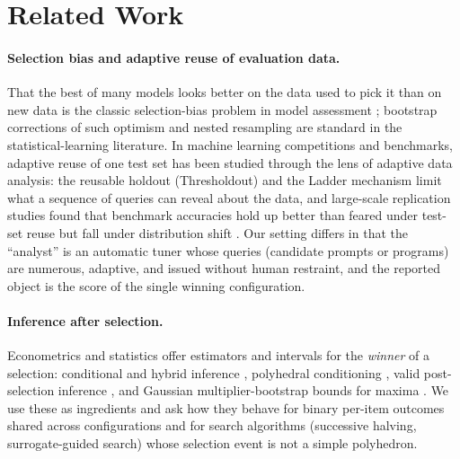 \section{Related Work}
\paragraph{Selection bias and adaptive reuse of evaluation data.}
That the best of many models looks better on the data used to pick it than on new data is the classic selection-bias problem in model assessment \citep{cawley2010overfitting}; bootstrap corrections of such optimism \citep{efron1997632} and nested resampling are standard in the statistical-learning literature.
In machine learning competitions and benchmarks, adaptive reuse of one test set has been studied through the lens of adaptive data analysis: the reusable holdout (Thresholdout) \citep{dwork2015generalization,dwork2015preserving} and the Ladder mechanism \citep{blum2015ladder} limit what a sequence of queries can reveal about the data, and large-scale replication studies found that benchmark accuracies hold up better than feared under test-set reuse but fall under distribution shift \citep{recht2019imagenet}.
Our setting differs in that the ``analyst'' is an automatic tuner whose queries (candidate prompts or programs) are numerous, adaptive, and issued without human restraint, and the reported object is the score of the single winning configuration.

\paragraph{Inference after selection.}
Econometrics and statistics offer estimators and intervals for the \emph{winner} of a selection: conditional and hybrid inference \citep{andrews2024inference}, polyhedral conditioning \citep{lee2016exact}, valid post-selection inference \citep{berk2013valid}, and Gaussian multiplier-bootstrap bounds for maxima \citep{chernozhukov2013gaussian}.
We use these as ingredients and ask how they behave for binary per-item outcomes shared across configurations and for search algorithms (successive halving, surrogate-guided search) whose selection event is not a simple polyhedron.

